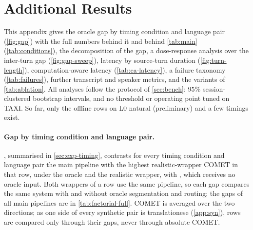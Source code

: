 \section{Additional Results}\label{app:results}

This appendix gives the oracle gap by timing condition and language pair (\cref{fig:gap}) with the full numbers behind it and behind \cref{tab:main} (\cref{tab:conditions}), the decomposition of the gap, a dose-response analysis over the inter-turn gap (\cref{fig:gap-sweep}), latency by source-turn duration (\cref{fig:turn-length}), computation-aware latency (\cref{tab:ca-latency}), a failure taxonomy (\cref{tab:failures}), further transcript and speaker metrics, and the variants of \cref{tab:ablation}. All analyses follow the protocol of \cref{sec:bench}: 95\% session-clustered bootstrap intervals, and no threshold or operating point tuned on TAXI. So far, only the offline rows on \taxi L0 natural (preliminary) and a few timings exist.

\paragraph{Gap by timing condition and language pair.}
, summarised in \cref{sec:exp-timing}, contrasts for every timing condition and language pair the main pipeline with the highest realistic-wrapper COMET in that row, under the oracle and the realistic wrapper, with \model, which receives no oracle input. Both wrappers of a row use the same pipeline, so each gap compares the same system with and without oracle segmentation and routing; the gaps of all main pipelines are in \cref{tab:factorial-full}. COMET is averaged over the two directions; as one side of every synthetic pair is translationese (\cref{app:syn}), rows are compared only through their gaps, never through absolute COMET.

